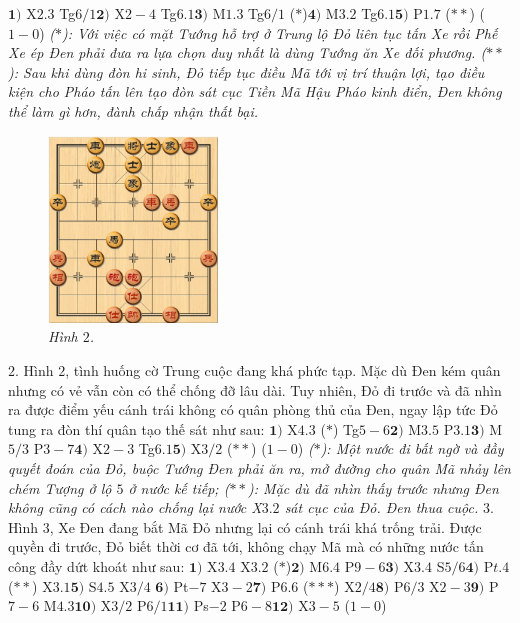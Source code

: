 \begin{multicols}{2}
	$\pmb{1)}$ X$2.3$ Tg$6/1$\quad  $\pmb{2)}$ X$2-4$ Tg$6.1$\quad $\pmb{3)}$ M$1.3$ Tg$6/1$ ($*$)\quad $\pmb{4)}$ M$3.2$ Tg$6.1$\quad  $\pmb{5)}$ P$1.7$ ($**$) ($1-0$)
	\vskip 0.1cm
	\textit{($*$): Với việc có mặt Tướng hỗ trợ ở Trung lộ  Đỏ liên tục tấn Xe rồi Phế Xe ép Đen phải đưa ra lựa chọn duy nhất là dùng Tướng ăn Xe đối phương. 
	\vskip 0.1cm
	($**$): Sau khi dùng đòn hi sinh, Đỏ tiếp tục điều Mã tới vị trí thuận lợi, tạo điều kiện cho Pháo tấn lên tạo đòn sát cục Tiền Mã Hậu Pháo kinh điển, Đen không thể làm gì hơn, đành chấp nhận thất bại.}
	\begin{figure}[H]
		\vspace*{-5pt}
		\centering
		\captionsetup{labelformat= empty, justification=centering}
		\includegraphics[width= 0.4\textwidth]{2}
		\caption{\small\textit{\color{gocco}Hình $2$.}}
		\vspace*{-10pt}
	\end{figure}
	$2.$ Hình $2$, tình huống cờ Trung cuộc đang khá phức tạp. Mặc dù Đen kém quân nhưng có vẻ vẫn còn có thể chống đỡ lâu dài. Tuy nhiên,  Đỏ đi trước và đã nhìn ra được điểm yếu cánh trái không có quân phòng thủ của Đen, ngay lập tức Đỏ tung ra đòn thí quân tạo thế sát như sau:
	\vskip 0.1cm
	$\pmb{1)}$ X$4.3$ ($*$) Tg$5-6$\quad $\pmb{2)}$ M$3.5$ P$3.1$\quad  $\pmb{3)}$ M$5/3$ P$3-7$\quad $\pmb{4)}$ X$2-3$  Tg$6.1$\quad $\pmb{5)}$ X$3/2$ ($**$) ($1-0$)
	\vskip 0.1cm
	\textit{($*$): Một nước đi bất ngờ và đầy quyết đoán của Đỏ, buộc Tướng Đen phải ăn ra, mở đường cho quân Mã nhảy lên chém Tượng ở lộ $5$ ở nước kế tiếp;
	\vskip 0.1cm
	($**$): Mặc dù đã nhìn thấy trước nhưng Đen không cũng có cách nào chống lại nước X$3.2$ sát cục của Đỏ. Đen thua cuộc.}
	\vskip 0.1cm
	$3.$ Hình $3$, Xe Đen đang bắt Mã Đỏ nhưng lại có cánh trái khá trống trải. Được quyền đi trước, Đỏ biết thời cơ đã tới, không chạy Mã mà có những nước tấn công đầy dứt khoát như sau:
	\vskip 0.1cm
	$\pmb{1)}$	X$3.4$ X$3.2$ ($*$)\quad  $\pmb{2)}$ M$6.4$ P$9-6$\quad  $\pmb{3)}$ X$3.4$ S$5/6$\quad $\pmb{4)}$ P$t.4$ ($**$) X$3.1$\quad $\pmb{5)}$ S$4.5$ X$3/4$ \quad $\pmb{6)}$ Pt$-7$ X$3-2$\quad $\pmb{7)}$ P$6.6$ ($***$) X$2/4$\quad $\pmb{8)}$ P$6/3$ X$2-3$\quad $\pmb{9)}$ P$7-6$ M$4.3$\quad $\pmb{10)}$ X$3/2$ P$6/1$\quad $\pmb{11)}$ Ps$-2$ P$6-8$\quad $\pmb{12)}$ X$3-5$ ($1-0$)

\end{multicols}
